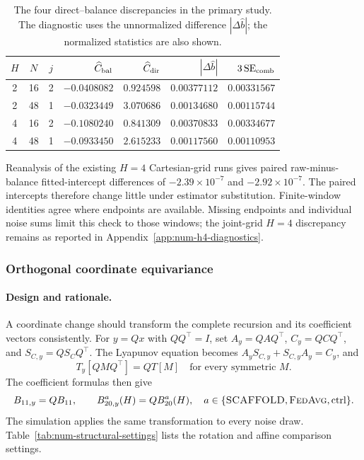 \begin{table}[tbp]
\centering\small
\setlength{\tabcolsep}{3pt}
\caption{The four direct--balance discrepancies in the primary
\FedAvg{} study. The diagnostic uses the unnormalized difference
$|\Delta\widehat b|$; the normalized statistics are also shown.}
\label{tab:E-direct-balance}
\begin{tabular}{@{}cccrrrr@{}}
\toprule
$H$ & $N$ & $j$ & $\widehat C_{\rm bal}$ & $\widehat C_{\rm dir}$ &
$|\Delta\widehat b|$ & $3\operatorname{SE}_{\rm comb}$ \\
\midrule
2 & 16 & 2 &
$-0.0408082$ & $ 0.924598$ & $0.00377112$ & $0.00331567$ \\
2 & 48 & 1 &
$-0.0323449$ & $ 3.070686$ & $0.00134680$ & $0.00115744$ \\
4 & 16 & 2 &
$-0.1080240$ & $ 0.841309$ & $0.00370833$ & $0.00334677$ \\
4 & 48 & 1 &
$-0.0933450$ & $ 2.615233$ & $0.00117560$ & $0.00110953$ \\
\bottomrule
\end{tabular}
\end{table}

Reanalysis of the existing $H=4$ Cartesian-grid runs gives paired
raw-minus-balance fitted-intercept differences of
$-2.39\times10^{-7}$ and $-2.92\times10^{-7}$. The paired intercepts
therefore change little under estimator substitution. Finite-window
identities agree where endpoints are available. Missing endpoints and
individual noise sums limit this check to those windows; the joint-grid
$H=4$ discrepancy remains as reported in
Appendix~\ref{app:num-h4-diagnostics}.

\subsubsection{Orthogonal coordinate equivariance}
\label{app:equivariance-check}
\label{app:equivariance}

\paragraph{Design and rationale.}
A coordinate change should transform the complete recursion and its
coefficient vectors consistently. For $y=Qx$ with $QQ^\top=I$, set
$A_y=QAQ^\top$, $C_y=QCQ^\top$, and $S_{C,y}=QS_CQ^\top$.
The Lyapunov equation becomes $A_yS_{C,y}+S_{C,y}A_y=C_y$, and
\begin{equation}
\label{eq:D-tensor-equiv}
 T_y[QMQ^\top]=QT[M]
 \quad\text{for every symmetric }M.
\end{equation}
The coefficient formulas then give
\begin{equation}
\label{eq:D-coefficient-equivariance}
 B_{11,y}=QB_{11},\qquad
 B_{20,y}^{a}(H)=QB_{20}^{a}(H),\quad
 a\in\{\textnormal{\textsc{SCAFFOLD}},\textnormal{\textsc{FedAvg}},\mathrm{ctrl}\}.
\end{equation}
The simulation applies the same transformation to every noise draw.
Table~\ref{tab:num-structural-settings} lists the rotation and affine
comparison settings.

